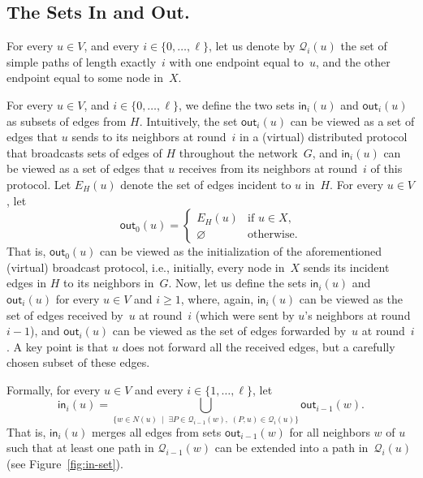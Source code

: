 \documentclass{article}
\newcommand{\F}{{\mathsf{out}}}
\renewcommand{\H}{{\mathsf{in}}}
\newcommand{\bp}{X}
\begin{document}
\subsection{The Sets In and Out.}\label{subsec:set_in_out}

For every $u\in V$, and every $i\in\{0,\dots,\ell\}$, let us denote  by $\mathcal{Q}_i(u)$ the set of simple paths of length exactly~$i$ with one endpoint equal to~$u$, and the other endpoint equal to some node in~$\bp$. 

For every $u\in V$, and $i\in\{0,\dots,\ell\}$, we define the two sets $\H_i(u)$ and $\F_i(u)$ as subsets of edges from $H$. Intuitively, the set $\F_i(u)$ can be viewed as a set of edges that $u$ sends to its neighbors at round~$i$ in a (virtual) distributed protocol that broadcasts sets of edges of $H$ throughout the network~$G$, and $\H_i(u)$ can be viewed as a set of edges that $u$ receives from its neighbors at round~$i$ of this protocol. 
Let $E_H(u)$ denote the set of edges incident to $u$ in~$H$. For every $u\in V$, let 
\begin{equation}\label{eq:OUT_init}
    \F_0(u) = \left\{\begin{array}{cl}
    E_H(u) & \mbox{if $u\in \bp$,} \\
    \varnothing & \mbox{otherwise.}
    \end{array}\right.
\end{equation}
That is, $\F_0(u)$ can be viewed as the initialization of the aforementioned (virtual) broadcast protocol, i.e., initially, every node in~$X$ sends its incident edges in $H$ to its neighbors in~$G$. Now, let us define the sets $\H_i(u)$ and $\F_i(u)$ for every $u\in V$ and $i\geq 1$, where, again, $\H_i(u)$ can be viewed as the set of edges received by~$u$ at round~$i$ (which were sent by $u$'s neighbors at round $i-1$), and $\F_i(u)$ can be viewed as the set of edges forwarded by~$u$ at round~$i$. A key point is that $u$ does not forward all the received edges, but a carefully chosen subset of these edges.  


Formally, for every $u\in V$ and every $i\in\{1,\dots,\ell\}$, let
\begin{equation}\label{eq:IN_recur}
    \H_i(u) = \bigcup_{\{w\in N(u) \;\mid\; \exists P\in\mathcal{Q}_{i-1}(w),\; (P,u)\in\mathcal{Q}_i(u)\}} \F_{i-1}(w).
\end{equation}
That is, $\H_i(u)$ merges all edges from sets $\F_{i-1}(w)$ for all neighbors $w$ of $u$ such that at least one path in $\mathcal{Q}_{i-1}(w)$ can be extended into a path in~$\mathcal{Q}_i(u)$ (see Figure~\ref{fig:in-set}).
\end{document}
